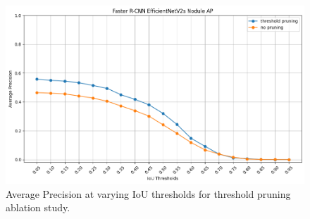 \begin{figure}[h]
    \centering
    \includegraphics[width=0.8\linewidth]{images/threshold-pruning-ablation.png}
    \caption{Average Precision at varying IoU thresholds for threshold pruning ablation study.}
    \label{fig:threshold-pruning-ablation}
\end{figure}